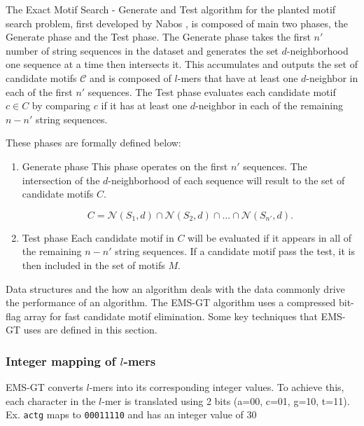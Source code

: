 
The Exact Motif Search - Generate and Test algorithm for the planted motif search problem, first developed by Nabos \cite{nabos2015dissertation}, is composed of main two phases, the Generate phase and the Test phase. The Generate phase takes the first $n'$ number of string sequences in the dataset and generates the set $d$-neighborhood one sequence at a time then intersects it. This accumulates and outputs the set of candidate motifs $\mathcal{C}$ and is composed of $l$-mers that have at least one $d$-neighbor in each of the first $n'$ sequences. The Test phase evaluates each candidate motif $c \in C$ by comparing $c$ if it has at least one $d$-neighbor in each of the remaining $n - n'$ string sequences. \newline

\noindent These phases are formally defined below:
\begin{enumerate} [label={\em (\alph*)}]

	\item {Generate phase} \newline
	This phase operates on the first $n'$ sequences. The intersection of the $d$-neighborhood of each sequence will result to the set of candidate motifs $C$.\newline

	\begin{equation}
		C = \mathcal{N}(S_{1}, d) \cap \mathcal{N}(S_{2}, d) \cap...\cap \mathcal{N}(S_{n'}, d).
	\end{equation} 

	\item {Test phase}\newline
	Each candidate motif in $C$ will be evaluated if it appears in all of the remaining $n - n'$ string sequences. If a candidate motif pass the test, it is then included in the set of motifs $M$. 

\end{enumerate}

% 

% 

Data structures and the how an algorithm deals with the data commonly drive the performance of an algorithm. The EMS-GT algorithm uses a compressed bit-flag array for fast candidate motif elimination. Some key techniques that EMS-GT uses are defined in this section.

	\subsubsection{Integer mapping of $l$-mers}
	EMS-GT converts $l$-mers into its corresponding integer values. To achieve this, each character in the $l$-mer is translated using 2 bits (a=00, c=01, g=10, t=11). \newline
		{\small Ex.	\texttt{actg} maps to \texttt{00011110} and has an integer value of 30} 

